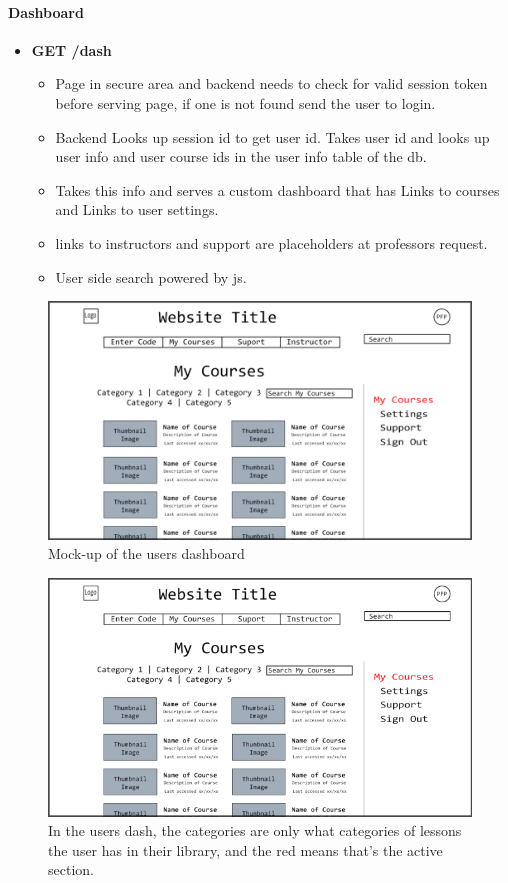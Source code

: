\documentclass{article}
\begin{document}
\paragraph{Dashboard}
\vspace{\baselineskip}
\begin{itemize}
    \item \textbf{GET /dash}
        \begin{itemize}
        \item Page in secure area and backend needs to check for valid session
            token before serving page, if one is not found send the user to
                login.
        \item Backend Looks up session id to get user id. Takes user id and
            looks up user info and user course ids in the user info table of
                the db.
        \item Takes this info and serves a custom dashboard that has Links to
            courses and Links to user settings.
        \item links to instructors and support are placeholders at professors request.
        \item User side search powered by js.
    \end{itemize}
\end{itemize}
\begin{figure}[h!]
    \caption{Mock-up of the users dashboard}
    \includegraphics[width=\textwidth]{user_page}
\end{figure}
\begin{figure}[h!]
    \caption{In the users dash, the categories are only what categories of
    lessons the user has in their library, and the red means that's the active
    section.}
    \includegraphics[width=\textwidth]{user_page_red}
\end{figure}
\end{document}
